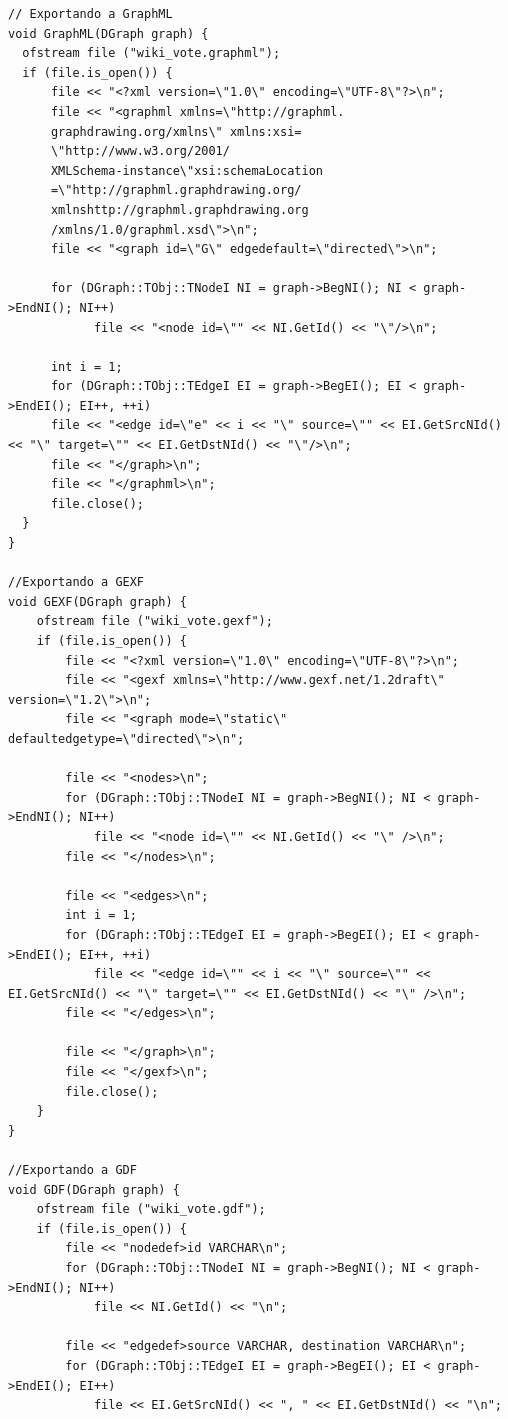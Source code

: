 \documentclass[12pt, letterpaper, twocolumn]{article}
\begin{document}
\begin{lstlisting}
// Exportando a GraphML 
void GraphML(DGraph graph) {
  ofstream file ("wiki_vote.graphml");
  if (file.is_open()) {
      file << "<?xml version=\"1.0\" encoding=\"UTF-8\"?>\n";
      file << "<graphml xmlns=\"http://graphml.
      graphdrawing.org/xmlns\" xmlns:xsi=
      \"http://www.w3.org/2001/
      XMLSchema-instance\"xsi:schemaLocation
      =\"http://graphml.graphdrawing.org/
      xmlnshttp://graphml.graphdrawing.org
      /xmlns/1.0/graphml.xsd\">\n";
      file << "<graph id=\"G\" edgedefault=\"directed\">\n";

      for (DGraph::TObj::TNodeI NI = graph->BegNI(); NI < graph->EndNI(); NI++)
			file << "<node id=\"" << NI.GetId() << "\"/>\n";

      int i = 1;
      for (DGraph::TObj::TEdgeI EI = graph->BegEI(); EI < graph->EndEI(); EI++, ++i)
      file << "<edge id=\"e" << i << "\" source=\"" << EI.GetSrcNId() << "\" target=\"" << EI.GetDstNId() << "\"/>\n";
      file << "</graph>\n";
      file << "</graphml>\n";
      file.close();
  }
}

//Exportando a GEXF
void GEXF(DGraph graph) {
	ofstream file ("wiki_vote.gexf");
	if (file.is_open()) {
		file << "<?xml version=\"1.0\" encoding=\"UTF-8\"?>\n";
		file << "<gexf xmlns=\"http://www.gexf.net/1.2draft\" version=\"1.2\">\n";
		file << "<graph mode=\"static\" defaultedgetype=\"directed\">\n";

		file << "<nodes>\n";
		for (DGraph::TObj::TNodeI NI = graph->BegNI(); NI < graph->EndNI(); NI++)
			file << "<node id=\"" << NI.GetId() << "\" />\n";
		file << "</nodes>\n";

		file << "<edges>\n";
		int i = 1;
		for (DGraph::TObj::TEdgeI EI = graph->BegEI(); EI < graph->EndEI(); EI++, ++i)
			file << "<edge id=\"" << i << "\" source=\"" << EI.GetSrcNId() << "\" target=\"" << EI.GetDstNId() << "\" />\n";
		file << "</edges>\n";

		file << "</graph>\n";
		file << "</gexf>\n";
		file.close();
	}
}

//Exportando a GDF
void GDF(DGraph graph) {
	ofstream file ("wiki_vote.gdf");
	if (file.is_open()) {
		file << "nodedef>id VARCHAR\n";
		for (DGraph::TObj::TNodeI NI = graph->BegNI(); NI < graph->EndNI(); NI++)
			file << NI.GetId() << "\n";

		file << "edgedef>source VARCHAR, destination VARCHAR\n";
		for (DGraph::TObj::TEdgeI EI = graph->BegEI(); EI < graph->EndEI(); EI++)
			file << EI.GetSrcNId() << ", " << EI.GetDstNId() << "\n";


\end{lstlisting}
\end{document}
